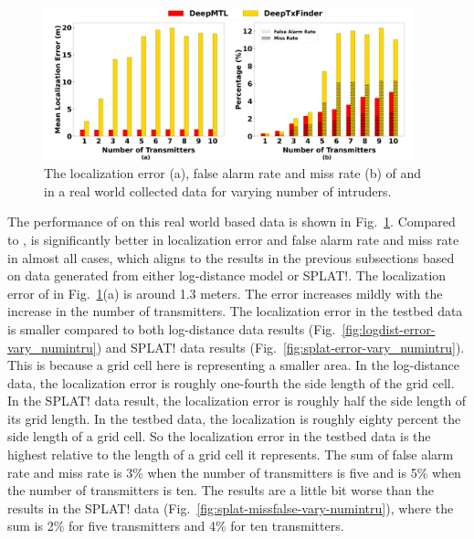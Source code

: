 \begin{figure}
    \centering
    \includegraphics[width=0.95\textwidth]{chapters/wowmom-pmc/figures/ipsn_testbed-error_false_miss_vary_numintru.png}
    \caption{The localization error (a), false alarm rate and miss rate (b) of \our and \deeptx in a real world collected data for varying number of intruders.}
    \label{fig:ipsn}
\end{figure}

The performance of \our on this real world based data is shown in Fig.~\ref{fig:ipsn}.
Compared to \deeptx, \our is significantly better in localization error and false alarm rate and miss rate in almost all cases, which aligns to the results in the previous subsections based on data generated from either log-distance model or SPLAT!.
The localization error of \our in Fig.~\ref{fig:ipsn}(a) is around 1.3 meters.
The error increases mildly with the increase in the number of transmitters.
The localization error in the testbed data is smaller compared to both log-distance data results (Fig.~\ref{fig:logdist-error-vary_numintru}) and SPLAT! data results (Fig.~\ref{fig:splat-error-vary_numintru}).
This is because a grid cell here is representing a smaller area.
In the log-distance data, the localization error is roughly one-fourth the side length of the grid cell. 
In the SPLAT! data result, the localization error is roughly half the side length of its grid length.
In the testbed data, the localization is roughly eighty percent the side length of a grid cell.
So the localization error in the testbed data is the highest relative to the length of a grid cell it represents.
The sum of false alarm rate and miss rate is 3\% when the number of transmitters is five and is 5\% when the number of transmitters is ten.
The results are a little bit worse than the results in the SPLAT! data (Fig.~\ref{fig:splat-missfalse-vary-numintru}), where the sum is 2\% for five transmitters and 4\% for ten transmitters.


